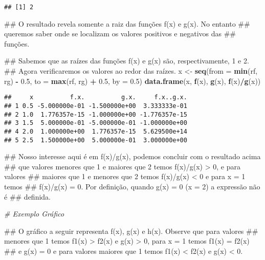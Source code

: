 \documentclass[]{book}
\newenvironment{Shaded}{\begin{snugshade}}{\end{snugshade}}
\newcommand{\KeywordTok}[1]{\textcolor[rgb]{0.13,0.29,0.53}{\textbf{#1}}}
\newcommand{\DataTypeTok}[1]{\textcolor[rgb]{0.13,0.29,0.53}{#1}}
\newcommand{\FloatTok}[1]{\textcolor[rgb]{0.00,0.00,0.81}{#1}}
\newcommand{\StringTok}[1]{\textcolor[rgb]{0.31,0.60,0.02}{#1}}
\newcommand{\CommentTok}[1]{\textcolor[rgb]{0.56,0.35,0.01}{\textit{#1}}}
\newcommand{\OperatorTok}[1]{\textcolor[rgb]{0.81,0.36,0.00}{\textbf{#1}}}
\newcommand{\NormalTok}[1]{#1}
\begin{document}
\begin{enumerate}
\begin{verbatim}
## [1] 2
\end{verbatim}

\begin{Shaded}
\begin{Highlighting}[]
\NormalTok{##  O resultado revela somente a raiz das funções f(x) e g(x). No entanto}
\NormalTok{## queremos saber onde se localizam os valores positivos e negativos das}
\NormalTok{## funções.}

\NormalTok{##  Sabemos que as raízes das funções f(x) e g(x) são, respectivamente, 1 e 2.}
\NormalTok{## Agora verificaremos os valores ao redor das raízes.}
\NormalTok{x <-}\StringTok{ }\KeywordTok{seq}\NormalTok{(}\DataTypeTok{from =} \KeywordTok{min}\NormalTok{(rf, rg) }\OperatorTok{-}\StringTok{ }\FloatTok{0.5}\NormalTok{, }\DataTypeTok{to =} \KeywordTok{max}\NormalTok{(rf, rg) }\OperatorTok{+}\StringTok{ }\FloatTok{0.5}\NormalTok{, }\DataTypeTok{by =} \FloatTok{0.5}\NormalTok{)}
\KeywordTok{data.frame}\NormalTok{(x, }\KeywordTok{f}\NormalTok{(x), }\KeywordTok{g}\NormalTok{(x), }\KeywordTok{f}\NormalTok{(x)}\OperatorTok{/}\KeywordTok{g}\NormalTok{(x))}
\end{Highlighting}
\end{Shaded}

\begin{verbatim}
##     x          f.x.          g.x.     f.x..g.x.
## 1 0.5 -5.000000e-01 -1.500000e+00  3.333333e-01
## 2 1.0  1.776357e-15 -1.000000e+00 -1.776357e-15
## 3 1.5  5.000000e-01 -5.000000e-01 -1.000000e+00
## 4 2.0  1.000000e+00  1.776357e-15  5.629500e+14
## 5 2.5  1.500000e+00  5.000000e-01  3.000000e+00
\end{verbatim}

\begin{Shaded}
\begin{Highlighting}[]
\NormalTok{##  Nosso interesse aqui é em f(x)/g(x), podemos concluir com o resultado acima}
\NormalTok{## que valores menores que 1 e maiores que 2 temos f(x)/g(x) > 0, e para valores}
\NormalTok{## maiores que 1 e menores que 2 temos f(x)/g(x) < 0 e para x = 1 temos}
\NormalTok{## f(x)/g(x) = 0. Por definição, quando g(x) = 0 (x = 2) a expressão não é}
\NormalTok{## definida.}

\CommentTok{# Exemplo Gráfico}

\NormalTok{##  O gráfico a seguir representa f(x), g(x) e h(x). Observe que para valores}
\NormalTok{## menores que 1 temos f1(x) > f2(x) e g(x) > 0, para x = 1 temos f1(x) = f2(x)}
\NormalTok{## e g(x) = 0 e para valores maiores que 1 temos f1(x) < f2(x) e g(x) < 0.}


\end{Highlighting}
\end{Shaded}
\end{enumerate}
\end{document}
